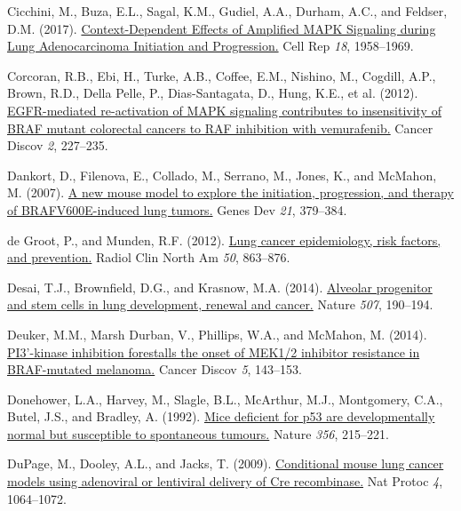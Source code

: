 \begin{CSLReferences}{0}{0}
\leavevmode{}%
Cicchini, M., Buza, E.L., Sagal, K.M., Gudiel, A.A., Durham, A.C., and Feldser, D.M. (2017). \href{https://doi.org/10.1016/j.celrep.2017.01.069}{Context-Dependent Effects of Amplified MAPK Signaling during Lung Adenocarcinoma Initiation and Progression.} Cell Rep \emph{18}, 1958--1969.

\leavevmode{}%
Corcoran, R.B., Ebi, H., Turke, A.B., Coffee, E.M., Nishino, M., Cogdill, A.P., Brown, R.D., Della Pelle, P., Dias-Santagata, D., Hung, K.E., et al. (2012). \href{https://doi.org/10.1158/2159-8290.cd-11-0341}{EGFR-mediated re-activation of MAPK signaling contributes to insensitivity of BRAF mutant colorectal cancers to RAF inhibition with vemurafenib.} Cancer Discov \emph{2}, 227--235.

\leavevmode{}%
Dankort, D., Filenova, E., Collado, M., Serrano, M., Jones, K., and McMahon, M. (2007). \href{https://doi.org/10.1101/gad.1516407}{A new mouse model to explore the initiation, progression, and therapy of BRAFV600E-induced lung tumors.} Genes Dev \emph{21}, 379--384.

\leavevmode{}%
de Groot, P., and Munden, R.F. (2012). \href{https://doi.org/10.1016/j.rcl.2012.06.006}{Lung cancer epidemiology, risk factors, and prevention.} Radiol Clin North Am \emph{50}, 863--876.

\leavevmode{}%
Desai, T.J., Brownfield, D.G., and Krasnow, M.A. (2014). \href{https://doi.org/10.1038/nature12930}{Alveolar progenitor and stem cells in lung development, renewal and cancer.} Nature \emph{507}, 190--194.

\leavevmode{}%
Deuker, M.M., Marsh Durban, V., Phillips, W.A., and McMahon, M. (2014). \href{https://doi.org/10.1158/2159-8290.cd-14-0856}{PI3'-kinase inhibition forestalls the onset of MEK1/2 inhibitor resistance in BRAF-mutated melanoma.} Cancer Discov \emph{5}, 143--153.

\leavevmode{}%
Donehower, L.A., Harvey, M., Slagle, B.L., McArthur, M.J., Montgomery, C.A., Butel, J.S., and Bradley, A. (1992). \href{https://doi.org/10.1038/356215a0}{Mice deficient for p53 are developmentally normal but susceptible to spontaneous tumours.} Nature \emph{356}, 215--221.

\leavevmode{}%
DuPage, M., Dooley, A.L., and Jacks, T. (2009). \href{https://doi.org/10.1038/nprot.2009.95}{Conditional mouse lung cancer models using adenoviral or lentiviral delivery of Cre recombinase.} Nat Protoc \emph{4}, 1064--1072.


\end{CSLReferences}
